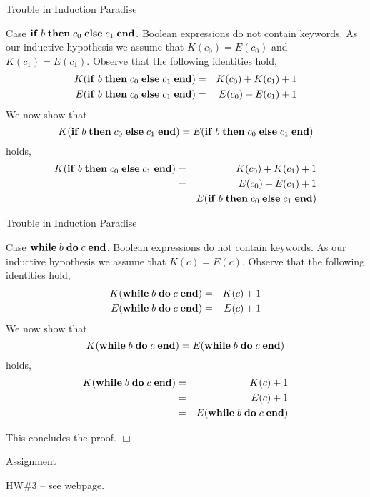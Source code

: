 \documentclass{beamer}
\begin{document}
\begin{frame}[fragile]{Trouble in Induction Paradise}

\small
Case ${\bf if}\; {b}\;{\bf then}\;{c_0}\;{\bf else}\;{c_1}\;\mbox{\bf end}$.  Boolean expressions do not contain keywords.  As our inductive hypothesis we assume that $K(c_0) = E(c_0)$ and $K(c_1) = E(c_1)$.  Observe that the following identities hold,
\begin{eqnarray*}
K({\bf if}\; {b}\;{\bf then}\;{c_0}\;{\bf else}\;{c_1}\;\mbox{\bf end}) &=& K(c_0) + K(c_1) + 1\\
E({\bf if}\; {b}\;{\bf then}\;{c_0}\;{\bf else}\;{c_1}\;\mbox{\bf end}) &=& E(c_0) + E(c_1) + 1
\end{eqnarray*}
We now show that
\[
K({\bf if}\; {b}\;{\bf then}\;{c_0}\;{\bf else}\;{c_1}\;\mbox{\bf end}) = E({\bf if}\; {b}\;{\bf then}\;{c_0}\;{\bf else}\;{c_1}\;\mbox{\bf end})
\]
holds,
\begin{eqnarray*}
K({\bf if}\; {b}\;{\bf then}\;{c_0}\;{\bf else}\;{c_1}\;\mbox{\bf end}) &=& K(c_0) + K(c_1) + 1\\ 
	&=& E(c_0) + E(c_1) + 1\\
	&=&E({\bf if}\; {b}\;{\bf then}\;{c_0}\;{\bf else}\;{c_1}\;\mbox{\bf end})
\end{eqnarray*}

\end{frame}


\begin{frame}[fragile]{Trouble in Induction Paradise}

\small
Case ${\bf while}\; {b}\;{\bf do}\;{c}\; \mbox{\bf end}$.  Boolean expressions do not contain keywords.  As our inductive hypothesis we assume that $K(c) = E(c)$.  Observe that the following identities hold,
\begin{eqnarray*}
K({\bf while}\; {b}\;{\bf do}\;{c}\; \mbox{\bf end}) &=& K(c) + 1\\
E({\bf while}\; {b}\;{\bf do}\;{c}\; \mbox{\bf end}) &=& E(c) + 1
\end{eqnarray*}
We now show that
\[
K({\bf while}\; {b}\;{\bf do}\;{c}\; \mbox{\bf end}) = E({\bf while}\; {b}\;{\bf do}\;{c}\; \mbox{\bf end})
\]
holds,
\begin{eqnarray*}
K({\bf while}\; {b}\;{\bf do}\;{c}\; \mbox{\bf end}) &=& K(c) + 1\\ 
	&=& E(c) + 1\\
	&=&E({\bf while}\; {b}\;{\bf do}\;{c}\; \mbox{\bf end}) 
\end{eqnarray*}

This concludes the proof. $\Box$
\end{frame}


\begin{frame}[fragile]{Assignment}

HW\#3 -- see webpage.

\end{frame}
\end{document}
